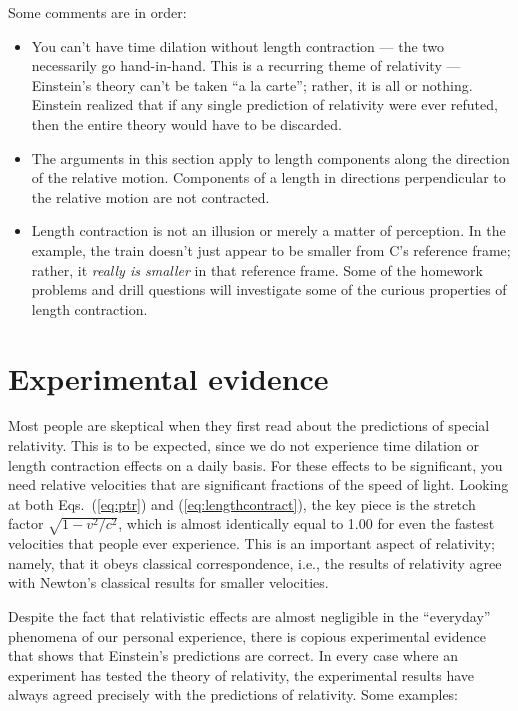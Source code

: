 Some comments are in order:  
\begin{itemize}
\item You can't have time dilation without length contraction --- the 
two necessarily go hand-in-hand.  This is a recurring theme of relativity ---
Einstein's theory can't be taken ``a la carte''; rather, it is all or nothing.
Einstein realized that if any single prediction of relativity were
ever refuted, then the entire theory would have to be discarded.  
\item The arguments in this section apply to length components along
the direction of the relative motion.  Components of a length in 
directions perpendicular to the relative motion are not contracted. 
\item Length contraction is not an illusion or merely a matter of
perception.  In the example, the train doesn't just appear to be
smaller from C's reference frame; rather, it  {\em really is
smaller} in that reference frame.  Some of the homework problems and
drill questions will investigate some of the curious properties of
length contraction.
\end{itemize}

\section{Experimental evidence}
   
Most people are skeptical when they first read about the predictions
of special relativity.  This is to be expected, since we do not
experience time dilation or length contraction effects on a daily
basis.  For these effects to be significant, you need relative
velocities that are significant fractions of the speed of light.
Looking at both Eqs.~(\ref{eq:ptr}) and (\ref{eq:lengthcontract}), the
key piece is the stretch factor $\sqrt{1-v^2/c^2}$, which is almost
identically equal to 1.00 for even the fastest velocities that people
ever experience.  This is an important aspect of relativity;
namely, that it obeys classical correspondence, i.e., the results of
relativity agree with Newton's classical results for smaller
velocities.
   
Despite the fact that relativistic effects are almost negligible in
the ``everyday'' phenomena of our personal experience, there is 
copious experimental evidence
that shows that Einstein's predictions are correct.  In every case
where an experiment has tested the theory of relativity, the
experimental results have always agreed precisely with the predictions
of relativity.  Some examples:

